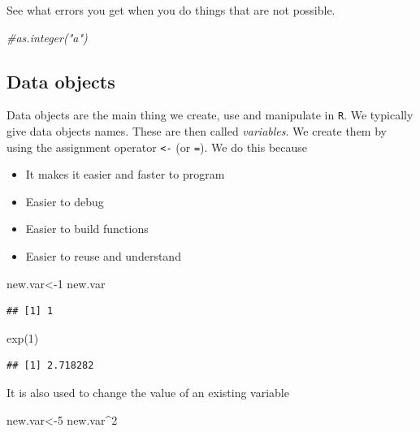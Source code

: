 \documentclass[
]{gitbook}
\newenvironment{Shaded}{\begin{snugshade}}{\end{snugshade}}
\newcommand{\CommentTok}[1]{\textcolor[rgb]{0.56,0.35,0.01}{\textit{#1}}}
\newcommand{\DecValTok}[1]{\textcolor[rgb]{0.00,0.00,0.81}{#1}}
\newcommand{\FunctionTok}[1]{\textcolor[rgb]{0.00,0.00,0.00}{#1}}
\newcommand{\NormalTok}[1]{#1}
\newcommand{\OtherTok}[1]{\textcolor[rgb]{0.56,0.35,0.01}{#1}}
\newcommand{\SpecialCharTok}[1]{\textcolor[rgb]{0.00,0.00,0.00}{#1}}
\providecommand{\tightlist}{%
  \setlength{\itemsep}{0pt}\setlength{\parskip}{0pt}}
\begin{document}
See what errors you get when you do things that are not possible.

\begin{Shaded}
\begin{Highlighting}[]
\CommentTok{\#as.integer("a")}
\end{Highlighting}
\end{Shaded}

\hypertarget{data-objects}{%
\subsection{Data objects}\label{data-objects}}

Data objects are the main thing we create, use and manipulate in \texttt{R}. We typically give data objects names. These are then called \emph{variables}. We create them by using the assignment operator \texttt{\textless{}-} (or \texttt{=}). We do this because

\begin{itemize}
\tightlist
\item
  It makes it easier and faster to program
\item
  Easier to debug
\item
  Easier to build functions
\item
  Easier to reuse and understand
\end{itemize}

\begin{Shaded}
\begin{Highlighting}[]
\NormalTok{new.var}\OtherTok{\textless{}{-}}\DecValTok{1}
\NormalTok{new.var}
\end{Highlighting}
\end{Shaded}

\begin{verbatim}
## [1] 1
\end{verbatim}

\begin{Shaded}
\begin{Highlighting}[]
\FunctionTok{exp}\NormalTok{(}\DecValTok{1}\NormalTok{)}
\end{Highlighting}
\end{Shaded}

\begin{verbatim}
## [1] 2.718282
\end{verbatim}

It is also used to change the value of an existing variable

\begin{Shaded}
\begin{Highlighting}[]
\NormalTok{new.var}\OtherTok{\textless{}{-}}\DecValTok{5}
\NormalTok{new.var}\SpecialCharTok{\^{}}\DecValTok{2}
\end{Highlighting}
\end{Shaded}
\end{document}
